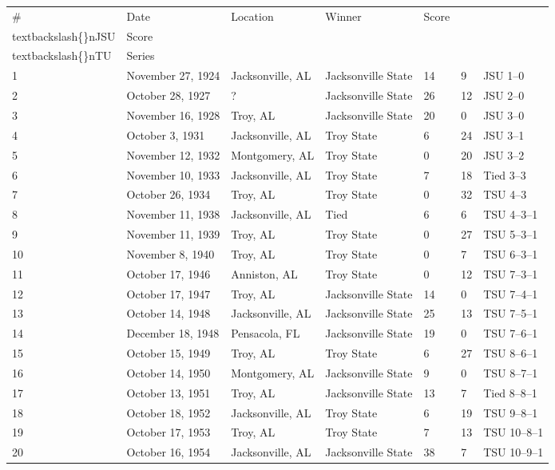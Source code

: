 \documentclass{article}
\begin{document}
\begin{tabular}{lllllll}
\toprule
\# & Date & Location & Winner & Score\\textbackslash\{\}nJSU & Score\\textbackslash\{\}nTU & Series \\
\midrule
1 & November 27, 1924 & Jacksonville, AL & Jacksonville State & 14 & 9 & JSU 1–0 \\
2 & October 28, 1927 & ? & Jacksonville State & 26 & 12 & JSU 2–0 \\
3 & November 16, 1928 & Troy, AL & Jacksonville State & 20 & 0 & JSU 3–0 \\
4 & October 3, 1931 & Jacksonville, AL & Troy State & 6 & 24 & JSU 3–1 \\
5 & November 12, 1932 & Montgomery, AL & Troy State & 0 & 20 & JSU 3–2 \\
6 & November 10, 1933 & Jacksonville, AL & Troy State & 7 & 18 & Tied 3–3 \\
7 & October 26, 1934 & Troy, AL & Troy State & 0 & 32 & TSU 4–3 \\
8 & November 11, 1938 & Jacksonville, AL & Tied & 6 & 6 & TSU 4–3–1 \\
9 & November 11, 1939 & Troy, AL & Troy State & 0 & 27 & TSU 5–3–1 \\
10 & November 8, 1940 & Troy, AL & Troy State & 0 & 7 & TSU 6–3–1 \\
11 & October 17, 1946 & Anniston, AL & Troy State & 0 & 12 & TSU 7–3–1 \\
12 & October 17, 1947 & Troy, AL & Jacksonville State & 14 & 0 & TSU 7–4–1 \\
13 & October 14, 1948 & Jacksonville, AL & Jacksonville State & 25 & 13 & TSU 7–5–1 \\
14 & December 18, 1948 & Pensacola, FL & Jacksonville State & 19 & 0 & TSU 7–6–1 \\
15 & October 15, 1949 & Troy, AL & Troy State & 6 & 27 & TSU 8–6–1 \\
16 & October 14, 1950 & Montgomery, AL & Jacksonville State & 9 & 0 & TSU 8–7–1 \\
17 & October 13, 1951 & Troy, AL & Jacksonville State & 13 & 7 & Tied 8–8–1 \\
18 & October 18, 1952 & Jacksonville, AL & Troy State & 6 & 19 & TSU 9–8–1 \\
19 & October 17, 1953 & Troy, AL & Troy State & 7 & 13 & TSU 10–8–1 \\
20 & October 16, 1954 & Jacksonville, AL & Jacksonville State & 38 & 7 & TSU 10–9–1 \\

\end{tabular}
\end{document}
